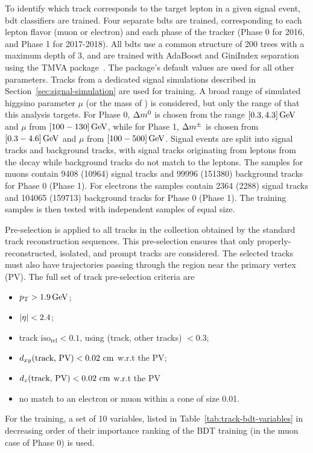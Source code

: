 To identify which track corresponds to the target lepton in a given signal event, \gls{bdt} classifiers are trained. Four separate \glspl{bdt} are trained, corresponding to each lepton flavor (muon or electron) and each phase of the tracker (Phase 0 for 2016, and Phase 1 for 2017-2018). All \glspl{bdt} use a common structure of 200 trees with a maximum depth of 3, and are trained with AdaBoost and GiniIndex separation using the TMVA package~\cite{tmva}. The package's default values are used for all other parameters. Tracks from a dedicated \FASTSIM signal simulations described in Section~\ref{sec:signal-simulation} are used for training. A broad range of simulated higgsino parameter $\mu$ (or the mass of \PSGcpmDo) is considered, but only the range of \dm that this analysis targets. For Phase 0, $\Delta m^0$ is chosen from the range $[0.3,4.3]\,\text{Ge\hspace{-.08em}V}$ and $\mu$ from $[100-130]\,\text{Ge\hspace{-.08em}V}$, while for Phase 1, $\Delta m^\pm$ is chosen from $[0.3-4.6]\,\text{Ge\hspace{-.08em}V}$ and $\mu$ from $[100-500]\,\text{Ge\hspace{-.08em}V}$. Signal events are split into signal tracks and background tracks, with signal tracks originating from leptons from the decay \neuttdecay while background tracks do not match to the leptons. The samples for muons contain 9408 (10964) signal tracks and 99996 (151380) background tracks for Phase 0 (Phase 1). For electrons the samples contain 2364 (2288) signal tracks and 104065 (159713) background tracks for Phase 0 (Phase 1). The training samples is then tested with independent samples of equal size. 

Pre-selection is applied to all tracks in the collection obtained by the standard track reconstruction sequences. This pre-selection ensures that only properly-reconstructed, isolated, and prompt tracks are considered. The selected tracks must also have trajectories passing through the region near the primary vertex (PV). The full set of track pre-selection criteria are
\begin{itemize}
\item $ p_{\mathrm{T}} > 1.9 \,\text{Ge\hspace{-.08em}V}$;
\item $ \abs{\eta} < 2.4$;
\item track $\text{iso}_\text{rel}  < 0.1$, using \DR(track, other tracks) $< 0.3$;
\item $d_{xy}(\text{track, PV}) < 0.02\, \,\text{cm}$ w.r.t the PV;
\item $d_z(\text{track, PV}) < 0.02\, \,\text{cm}$ w.r.t the PV
\item no match to an electron or muon within a cone of size 0.01.
\end{itemize}
For the training, a set of 10 variables, listed in Table~\ref{tab:track-bdt-variables} in decreasing order of their importance ranking of the BDT training (in the muon case of Phase 0) is used.

